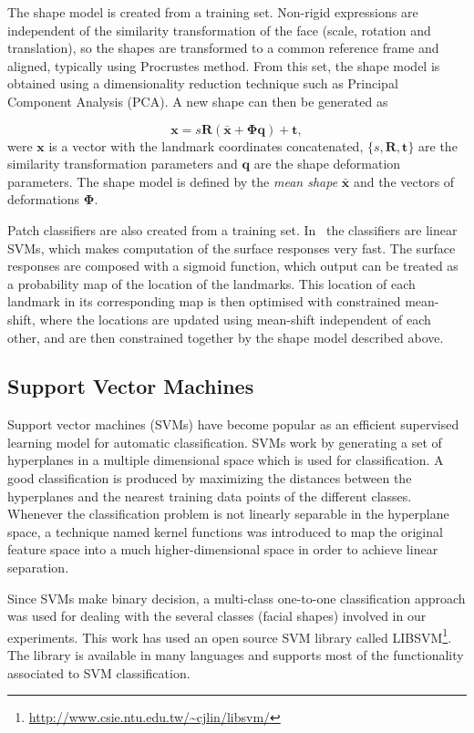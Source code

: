 \documentclass[]{article}
\begin{document}
The shape model is created from a training set. Non-rigid expressions are independent of the similarity transformation
of the face (scale, rotation and translation), so the shapes are transformed to a common reference frame and aligned,
typically using Procrustes method. From this set, the shape model is obtained using a dimensionality reduction technique
such as Principal Component Analysis (PCA). A new shape can then be generated as


\begin{equation}
  \label{eq:shape_model}
  \mathbf{x} = s\mathbf{R}(\bar{\mathbf{x}} +
  \boldsymbol{\Phi}\mathbf{q}) + \mathbf{t},
\end{equation}
were $\mathbf{x}$ is a vector with the landmark coordinates concatenated, 
$\{s,\mathbf{R},\mathbf{t}\}$ are the similarity transformation
parameters and $\mathbf{q}$ are the shape deformation parameters. The
shape model is defined by the \textit{mean shape} $\mathbf{\bar{x}}$
and the vectors of deformations $\boldsymbol{\Phi}$.


Patch classifiers are also created from a training set. In~\cite{saragih2011deformable} the classifiers are linear SVMs,
which makes computation of the surface responses very fast. The surface responses are composed with a sigmoid function,
which output can be treated as a probability map of the location of the landmarks. This location of each landmark in its
corresponding map is then optimised with constrained mean-shift, where the locations are updated using mean-shift
independent of each other, and are then constrained together by the shape model described above.


\subsection{Support Vector Machines}
Support vector machines (SVMs) have become popular as an efficient supervised learning model for automatic
classification. SVMs work by generating a set of hyperplanes in a multiple dimensional space which is used for
classification.  A good classification is produced by maximizing the distances between the hyperplanes and the nearest
training data points of the different classes. Whenever the classification problem is not linearly separable in the
hyperplane space, a technique named kernel functions was introduced to map the original feature space into a much
higher-dimensional space in order to achieve linear separation.

Since SVMs make binary decision, a multi-class one-to-one classification approach was used for dealing with the
several classes (facial shapes) involved in our experiments. This work has used an open source SVM library called
LIBSVM\footnote{\url{http://www.csie.ntu.edu.tw/~cjlin/libsvm/}}. The library is available in many languages and
supports most of the functionality associated to SVM classification.
\end{document}
